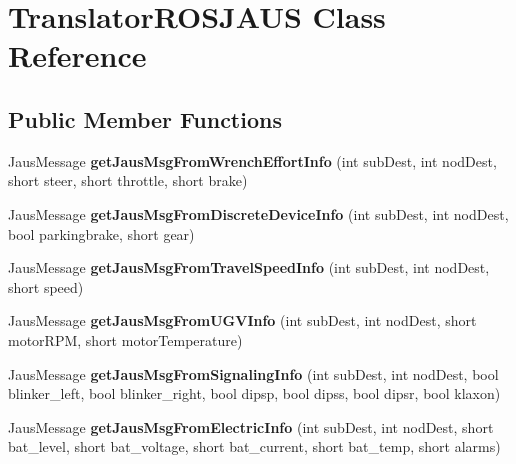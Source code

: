 \hypertarget{class_translator_r_o_s_j_a_u_s}{\section{\-Translator\-R\-O\-S\-J\-A\-U\-S \-Class \-Reference}
\label{class_translator_r_o_s_j_a_u_s}
}
\subsection*{\-Public \-Member \-Functions}
\begin{DoxyCompactItemize}
\item 
\hypertarget{class_translator_r_o_s_j_a_u_s_a620169de669e3c7d8ac40c63cb693a63}{\-Jaus\-Message {\bfseries get\-Jaus\-Msg\-From\-Wrench\-Effort\-Info} (int sub\-Dest, int nod\-Dest, short steer, short throttle, short brake)}\label{class_translator_r_o_s_j_a_u_s_a620169de669e3c7d8ac40c63cb693a63}

\item 
\hypertarget{class_translator_r_o_s_j_a_u_s_a87eb10a553b3ec255977e501eb3089a5}{\-Jaus\-Message {\bfseries get\-Jaus\-Msg\-From\-Discrete\-Device\-Info} (int sub\-Dest, int nod\-Dest, bool parkingbrake, short gear)}\label{class_translator_r_o_s_j_a_u_s_a87eb10a553b3ec255977e501eb3089a5}

\item 
\hypertarget{class_translator_r_o_s_j_a_u_s_a25ec5281c74836b66ff1d65b6185c13d}{\-Jaus\-Message {\bfseries get\-Jaus\-Msg\-From\-Travel\-Speed\-Info} (int sub\-Dest, int nod\-Dest, short speed)}\label{class_translator_r_o_s_j_a_u_s_a25ec5281c74836b66ff1d65b6185c13d}

\item 
\hypertarget{class_translator_r_o_s_j_a_u_s_abc3f8d61da5322d005bae24bb9cdb125}{\-Jaus\-Message {\bfseries get\-Jaus\-Msg\-From\-U\-G\-V\-Info} (int sub\-Dest, int nod\-Dest, short motor\-R\-P\-M, short motor\-Temperature)}\label{class_translator_r_o_s_j_a_u_s_abc3f8d61da5322d005bae24bb9cdb125}

\item 
\hypertarget{class_translator_r_o_s_j_a_u_s_a143d67f0f22f9df02e1439e0971162f3}{\-Jaus\-Message {\bfseries get\-Jaus\-Msg\-From\-Signaling\-Info} (int sub\-Dest, int nod\-Dest, bool blinker\-\_\-left, bool blinker\-\_\-right, bool dipsp, bool dipss, bool dipsr, bool klaxon)}\label{class_translator_r_o_s_j_a_u_s_a143d67f0f22f9df02e1439e0971162f3}

\item 
\hypertarget{class_translator_r_o_s_j_a_u_s_a68f7a6feeadff83ade999cd6a0fead71}{\-Jaus\-Message {\bfseries get\-Jaus\-Msg\-From\-Electric\-Info} (int sub\-Dest, int nod\-Dest, short bat\-\_\-level, short bat\-\_\-voltage, short bat\-\_\-current, short bat\-\_\-temp, short alarms)}\label{class_translator_r_o_s_j_a_u_s_a68f7a6feeadff83ade999cd6a0fead71}


\end{DoxyCompactItemize}
